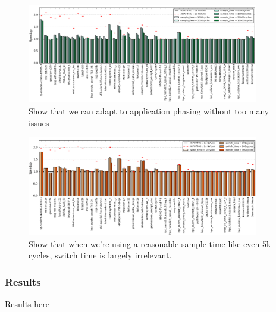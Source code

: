\begin{figure}[tp]
    \centering
    \includegraphics[width=0.9\textwidth]{figures/sample-time.jpg}
    \caption{Show that we can adapt to application phasing without too many issues}
    \label{fig:sampletime}
\end{figure}


\begin{figure}[tp]
    \centering
    \includegraphics[width=0.9\textwidth]{figures/switch-time.jpg}
    \caption{Show that when we're using a reasonable sample time like even 5k cycles, switch time is largely irrelevant.}
    \label{fig:switchtime}
\end{figure}

\subsubsection{Results}
Results here